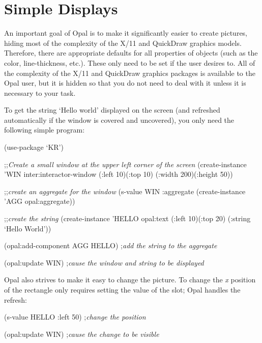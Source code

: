 \section{Simple Displays}

An important goal of Opal is to make it significantly easier to create
pictures, hiding most of the complexity of the X/11 and QuickDraw
graphics models.
Therefore, there are appropriate defaults for all properties of objects
(such as the color, line-thickness, etc.).  These only need to be set if
the user desires to.  All of the complexity of the X/11 and QuickDraw
graphics packages is available to the Opal user, but it is hidden so
that you do not need to deal with it unless it is necessary to your task.

\begin{group}
To get the string `Hello world'
displayed on the screen (and refreshed automatically if the window is
covered and uncovered), you only need the following simple program:

\vspace{.5 line}
\begin{programexample}
(use-package `KR')

;;{\it Create a small window at the upper left corner of the screen}
(create-instance 'WIN inter:interactor-window
  (:left 10)(:top 10)
  (:width 200)(:height 50))

;;{\it create an aggregate for the window}
(s-value WIN :aggregate (create-instance 'AGG opal:aggregate))

;;{\it create the string}
(create-instance 'HELLO opal:text
  (:left 10)(:top 20)
  (:string `Hello World'))

(opal:add-component AGG HELLO) ;{\it add the string to the aggregate}

(opal:update WIN) ;{\it cause the window and string to be displayed}
\end{programexample}
\end{group}
\vspace{.5 line}

Opal also strives to make it easy to change the picture.  To change the
{\it x} position of the rectangle only requires setting the value of the
 slot;  Opal handles the refresh:

\vspace{.2 line}
\begin{programexample}
(s-value HELLO :left 50)  ;{\it change the position}

(opal:update WIN) ;{\it cause the change to be visible}
\end{programexample}
\vspace{.2 line}


